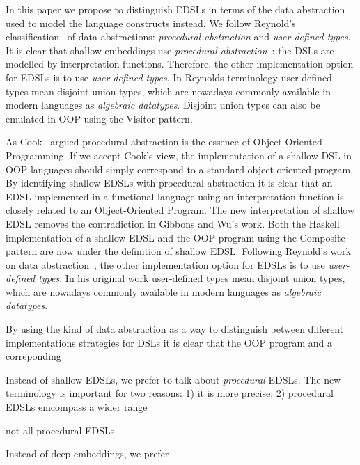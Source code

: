 In this paper we propose to distinguish EDSLs in terms of the data
abstraction used to model the language constructs instead.  We follow
Reynold's classification~\cite{} of data abstractions:
\emph{procedural abstraction} and \emph{user-defined types}. It is
clear that shallow embeddings use \emph{procedural
  abstraction}~\cite{}: the DSLs are modelled by interpretation
functions. Therefore, the other implementation option for EDSLs is to use
\emph{user-defined types}. In Reynolds terminology user-defined types
mean disjoint union types, which are nowadays commonly available in
modern languages as \emph{algebraic datatypes}. Disjoint union types 
can also be emulated in OOP using the {\sc Visitor} pattern.


As Cook~\cite{} argued
procedural abstraction is the essence of Object-Oriented
Programming. If we accept Cook's view, the implementation of a shallow
DSL in OOP languages should simply correspond to a standard
object-oriented program. By identifying shallow EDSLs with procedural
abstraction it is clear that an EDSL implemented in a functional
language using an interpretation function is closely related to an
Object-Oriented Program. The new interpretation of shallow EDSL
removes the contradiction in Gibbons and Wu's work. Both the Haskell
implementation of a shallow EDSL and the OOP program using the {\sc
  Composite} pattern are now under the definition of shallow
EDSL. Following Reynold's work on data abstraction~\cite{}, the other
implementation option for EDSLs is to use \emph{user-defined
  types}. In his original work user-defined types mean disjoint union
types, which are nowadays commonly available in modern languages as
\emph{algebraic datatypes}.


By using the kind of data abstraction as a way to distinguish 
between different implementations strategies for DSLs it is clear 
that the OOP program and a correponding 


Instead of shallow
EDSLs, we prefer to talk about \emph{procedural} EDSLs. The new
terminology is important for two reasons: 1) it is more precise; 
2) procedural EDSLs emcompass a wider range 

 not all procedural EDSLs  




Instead of deep embeddings, we prefer 

